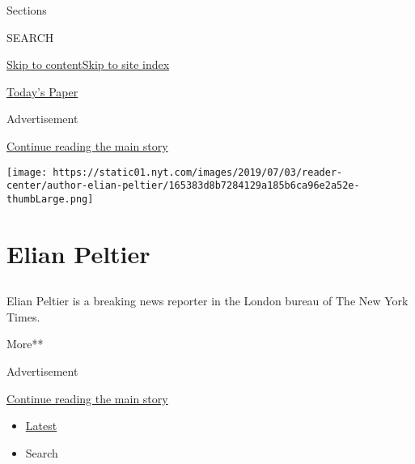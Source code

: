Sections

SEARCH

\protect\hyperlink{site-content}{Skip to
content}\protect\hyperlink{site-index}{Skip to site index}

\href{https://myaccount.nytimes.com/auth/login?response_type=cookie\&client_id=vi}{}

\href{https://www.nytimes.com/section/todayspaper}{Today's Paper}

Advertisement

\protect\hyperlink{after-top}{Continue reading the main story}

\texttt{[image: https://static01.nyt.com/images/2019/07/03/reader-center/author-elian-peltier/165383d8b7284129a185b6ca96e2a52e-thumbLarge.png]}

\hypertarget{elian-peltier}{%
\section{Elian Peltier}\label{elian-peltier}}

\subsection{}

Elian Peltier is a breaking news reporter in the London bureau of The
New York Times.

More**

Advertisement

\protect\hyperlink{after-mid1}{Continue reading the main story}

\begin{itemize}
\tightlist
\item
  \protect\hyperlink{stream-panel}{Latest}
\item
  Search
\end{itemize}

